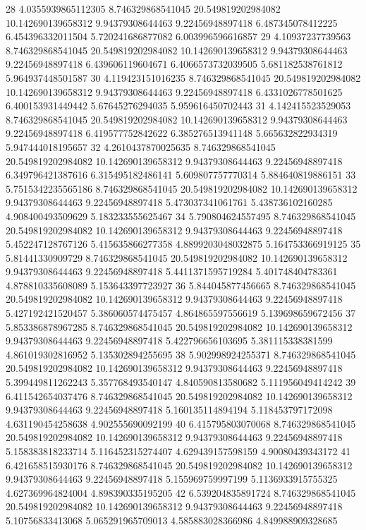 {28 4.0355939865112305 8.746329868541045 20.549819202984082 10.142690139658312 9.94379308644463 9.22456948897418 6.487345078412225 6.454396332011504 5.720241686877082 6.003996596616857
29 4.10937237739563 8.746329868541045 20.549819202984082 10.142690139658312 9.94379308644463 9.22456948897418 6.439606119604671 6.4066573732039505 5.681182538761812 5.964937448501587
30 4.119423151016235 8.746329868541045 20.549819202984082 10.142690139658312 9.94379308644463 9.22456948897418 6.4331026778501625 6.400153931449442 5.67645276294035 5.959616450702443
31 4.142415523529053 8.746329868541045 20.549819202984082 10.142690139658312 9.94379308644463 9.22456948897418 6.419577752842622 6.385276513941148 5.665632822934319 5.947444018195657
32 4.2610437870025635 8.746329868541045 20.549819202984082 10.142690139658312 9.94379308644463 9.22456948897418 6.349796421387616 6.315495182486141 5.609807757770314 5.884640819886151
33 5.7515342235565186 8.746329868541045 20.549819202984082 10.142690139658312 9.94379308644463 9.22456948897418 5.473037341061761 5.438736102160285 4.908400493509629 5.183233555625467
34 5.790804624557495 8.746329868541045 20.549819202984082 10.142690139658312 9.94379308644463 9.22456948897418 5.452247128767126 5.415635866277358 4.8899203048032875 5.164753366919125
35 5.81441330909729 8.746329868541045 20.549819202984082 10.142690139658312 9.94379308644463 9.22456948897418 5.4411371595719284 5.401748404783361 4.878810335608089 5.153643397723927
36 5.844045877456665 8.746329868541045 20.549819202984082 10.142690139658312 9.94379308644463 9.22456948897418 5.427192421520457 5.386060574475457 4.864865597556619 5.139698659672456
37 5.853386878967285 8.746329868541045 20.549819202984082 10.142690139658312 9.94379308644463 9.22456948897418 5.422796656103695 5.381115338381599 4.861019302816952 5.135302894255695
38 5.902998924255371 8.746329868541045 20.549819202984082 10.142690139658312 9.94379308644463 9.22456948897418 5.399449811262243 5.357768493540147 4.840590813580682 5.111956049414242
39 6.411542654037476 8.746329868541045 20.549819202984082 10.142690139658312 9.94379308644463 9.22456948897418 5.160135114894194 5.118453797172098 4.631190454258638 4.902555690092199
40 6.415795803070068 8.746329868541045 20.549819202984082 10.142690139658312 9.94379308644463 9.22456948897418 5.158383818233714 5.116452315274407 4.629439157598159 4.90080439343172
41 6.421658515930176 8.746329868541045 20.549819202984082 10.142690139658312 9.94379308644463 9.22456948897418 5.155969759997199 5.1136933915755325 4.627369964824004 4.898390335195205
42 6.539204835891724 8.746329868541045 20.549819202984082 10.142690139658312 9.94379308644463 9.22456948897418 5.10756833413068 5.065291965709013 4.585883028366986 4.849988909328685
}
